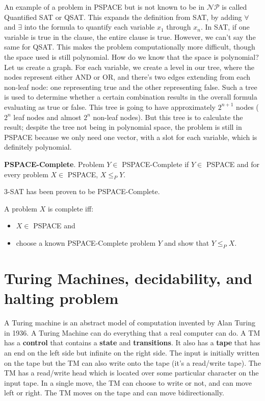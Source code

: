 \documentclass{article}
\begin{document}
An example of a problem in PSPACE but is not known to be in $\mathcal{NP}$ is called Quantified SAT or QSAT. This expands the definition from SAT, by adding $\forall$ and $\exists$ into the formula to quantify each variable $x_1$ through $x_n$. In SAT, if one variable is true in the clause, the entire clause is true. However, we can't say the same for QSAT. This makes the problem computationally more difficult, though the space used is still polynomial. How do we know that the space is polynomial? Let us create a graph. For each variable, we create a level in our tree, where the nodes represent either AND or OR, and there's two edges extending from each non-leaf node: one representing true and the other representing false. Such a tree is used to determine whether a certain combination results in the overall formula evaluating as true or false. This tree is going to have approximately $2^{n + 1}$ nodes ($2^n$ leaf nodes and almost $2^n$ non-leaf nodes). But this tree is to calculate the result; despite the tree not being in polynomial space, the problem is still in PSPACE because we only need one vector, with a slot for each variable, which is definitely polynomial.

\textbf{PSPACE-Complete}. Problem $Y \in$ PSPACE-Complete if $Y \in$ PSPACE and for every problem $X \in$ PSPACE, $X \leq_P Y$.

3-SAT has been proven to be PSPACE-Complete.

A problem $X$ is complete iff:
\begin{itemize}
    \item $X \in$ PSPACE and
    \item choose a known PSPACE-Complete problem $Y$ and show that $Y \leq_P X$.
\end{itemize}

\section{Turing Machines, decidability, and halting problem}
A Turing machine is an abstract model of computation invented by Alan Turing in 1936. A Turing Machine can do everything that a real computer can do. A TM has a \textbf{control} that contains a \textbf{state} and \textbf{transitions}. It also has a \textbf{tape} that has an end on the left side but infinite on the right side. The input is initially written on the tape but the TM can also write onto the tape (it's a read/write tape). The TM has a read/write head which is located over some particular character on the input tape. In a single move, the TM can choose to write or not, and can move left or right. The TM moves on the tape and can move bidirectionally.
\end{document}
